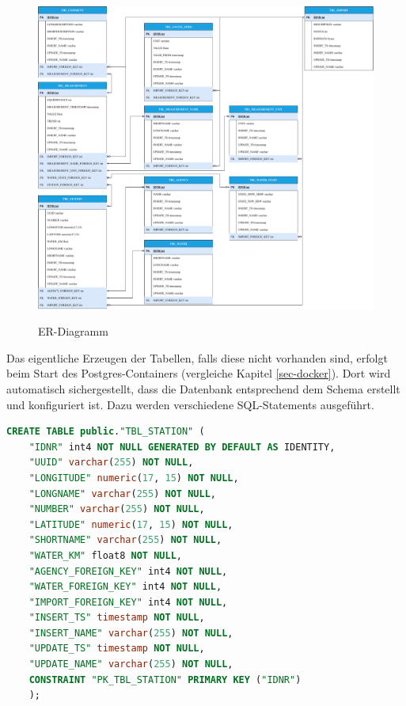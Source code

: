 \begin{figure}[H]
    \centering
    \includegraphics[width=\linewidth]{figures/ERModel.pdf}
    \label{fig:er-model-1}
    \caption{ER-Diagramm}
\end{figure}
\noindent Das eigentliche Erzeugen der Tabellen, falls diese nicht vorhanden sind, erfolgt beim Start des Postgres-Containers (vergleiche Kapitel \ref{sec-docker}). Dort wird automatisch sichergestellt, dass die Datenbank entsprechend dem Schema erstellt und 
konfiguriert ist. Dazu werden verschiedene SQL-Statements ausgeführt.
~\\
\begin{lstlisting}[language={SQL}, caption={Beispiel SQL-Statement zum Erstellen von TBL\_STATION}, captionpos=b, label={sql-tbl}]
   CREATE TABLE public."TBL_STATION" (
	"IDNR" int4 NOT NULL GENERATED BY DEFAULT AS IDENTITY,
	"UUID" varchar(255) NOT NULL,
	"LONGITUDE" numeric(17, 15) NOT NULL,
	"LONGNAME" varchar(255) NOT NULL,
	"NUMBER" varchar(255) NOT NULL,
	"LATITUDE" numeric(17, 15) NOT NULL,
	"SHORTNAME" varchar(255) NOT NULL,
	"WATER_KM" float8 NOT NULL,
	"AGENCY_FOREIGN_KEY" int4 NOT NULL,
	"WATER_FOREIGN_KEY" int4 NOT NULL,
	"IMPORT_FOREIGN_KEY" int4 NOT NULL,
	"INSERT_TS" timestamp NOT NULL,
	"INSERT_NAME" varchar(255) NOT NULL,
	"UPDATE_TS" timestamp NOT NULL,
	"UPDATE_NAME" varchar(255) NOT NULL,
	CONSTRAINT "PK_TBL_STATION" PRIMARY KEY ("IDNR")
    );
\end{lstlisting}

